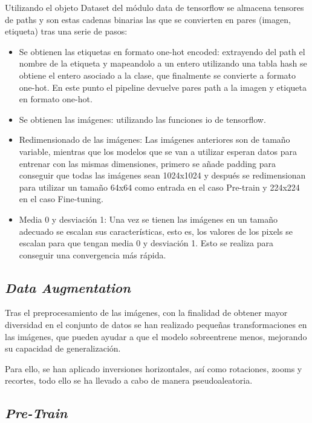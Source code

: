 Utilizando el objeto Dataset del módulo data de tensorflow se almacena tensores de paths y son estas cadenas binarias las que se convierten en pares (imagen, etiqueta) tras una serie de pasos:

\begin{itemize}
    \item Se obtienen las etiquetas en formato one-hot encoded: extrayendo del path el nombre de la etiqueta y mapeandolo a un entero utilizando una tabla hash se obtiene el entero asociado a la clase, que finalmente se convierte a formato one-hot. En este punto el pipeline devuelve pares path a la imagen y etiqueta en formato one-hot.

    \item Se obtienen las imágenes: utilizando las funciones io de tensorflow.

    \item Redimensionado de las imágenes: Las imágenes anteriores son de tamaño variable, mientras que los modelos que se van a utilizar esperan datos para entrenar con las mismas dimensiones, primero se añade padding para conseguir que todas las imágenes sean 1024x1024 y después se redimensionan para utilizar un tamaño 64x64 como entrada en el caso Pre-train y 224x224 en el caso Fine-tuning. 

    \item Media 0 y desviación 1: Una vez se tienen las imágenes en un tamaño adecuado se escalan sus características, esto es, los valores de los pixels se escalan para que tengan media 0 y desviación 1. Esto se realiza para conseguir una convergencia más rápida.

\end{itemize}

\subsection{\textit{Data Augmentation}}

Tras el preprocesamiento de las imágenes, con la finalidad de obtener mayor diversidad en el conjunto de datos se han realizado pequeñas transformaciones en las imágenes, que pueden ayudar a que el modelo  sobreentrene menos, mejorando su capacidad de generalización.

Para ello, se han aplicado inversiones horizontales, así como rotaciones, zooms y recortes, todo ello se ha llevado a cabo de manera pseudoaleatoria.

\subsection{\textit{Pre-Train}}

